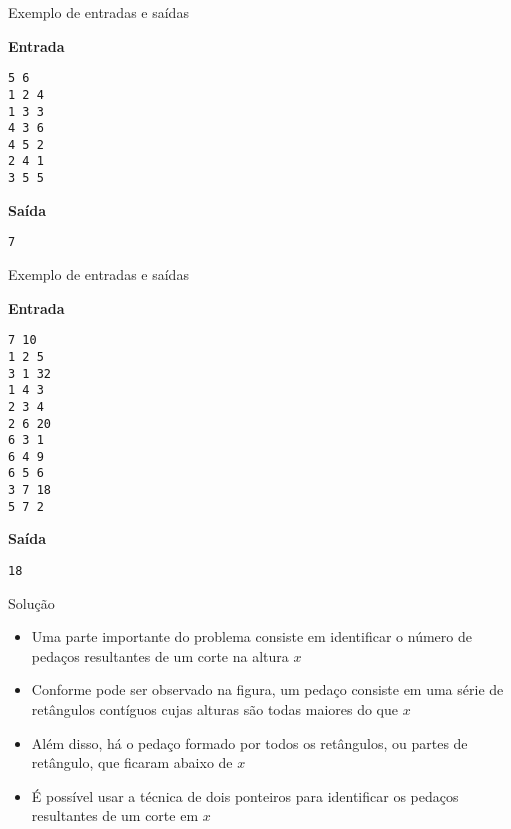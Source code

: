 \begin{frame}[fragile]{Exemplo de entradas e saídas}

\begin{minipage}[t]{0.45\textwidth}
\textbf{Entrada}
\begin{verbatim}
5 6
1 2 4
1 3 3
4 3 6
4 5 2
2 4 1
3 5 5
\end{verbatim}
\end{minipage}
\begin{minipage}[t]{0.5\textwidth}
\textbf{Saída}
\begin{verbatim}
7
\end{verbatim}
\end{minipage}
\end{frame}

\begin{frame}[fragile]{Exemplo de entradas e saídas}

\begin{minipage}[t]{0.45\textwidth}
\textbf{Entrada}
\begin{verbatim}
7 10
1 2 5
3 1 32
1 4 3
2 3 4
2 6 20
6 3 1
6 4 9
6 5 6
3 7 18
5 7 2
\end{verbatim}
\end{minipage}
\begin{minipage}[t]{0.5\textwidth}
\textbf{Saída}
\begin{verbatim}
18
\end{verbatim}
\end{minipage}
\end{frame}


\begin{frame}[fragile]{Solução}

    \begin{itemize}
        \item Uma parte importante do problema consiste em identificar o número de pedaços 
            resultantes de um corte na altura $x$

        \item Conforme pode ser observado na figura, um pedaço consiste em uma série de retângulos
            contíguos cujas alturas são todas maiores do que $x$

        \item Além disso, há o pedaço formado por todos os retângulos, ou partes de retângulo,
            que ficaram abaixo de $x$

        \item É possível usar a técnica de dois ponteiros para identificar os pedaços resultantes
            de um corte em $x$
    \end{itemize}

\end{frame}

